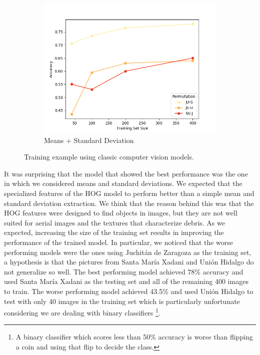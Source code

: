 \begin{figure}[ht]
\begin{subfigure}{.49\textwidth}
        \includegraphics[width=\textwidth]{images/classic-meanstd.png}
        \caption{Means + Standard Deviation}
    \end{subfigure}
  
  \caption{Training example using classic computer vision models.}
  \label{fig:classic}
\end{figure}

It was surprising that the model that showed the best performance was the one in which we considered means and standard deviations. We expected that the specialized features of the HOG model to perform better than a simple mean and standard deviation extraction. We think that the reason behind this was that the HOG features were designed to find objects in images, but they are not well suited for aerial images and the textures that characterize debris. As we expected, increasing the size of the training set results in improving the performance of the trained model. In particular, we noticed that the worse performing models were the ones using Juchit\'an de Zaragoza as the training set, a hypothesis is that the pictures from Santa Mar\'ia Xadani and Uni\'on Hidalgo do not generalize so well. The best performing model achieved 78\% accuracy and used Santa Mar\'ia Xadani as the testing set and all of the remaining 400 images to train. The worse performing model achieved 43.5\% and used Uni\'on Hidalgo to test with only 40 images in the training set which is particularly unfortunate considering we are dealing with binary classifiers \footnote{A binary classifier which scores less than 50\% accuracy is worse than flipping a coin and using that flip to decide the class.}.\\

